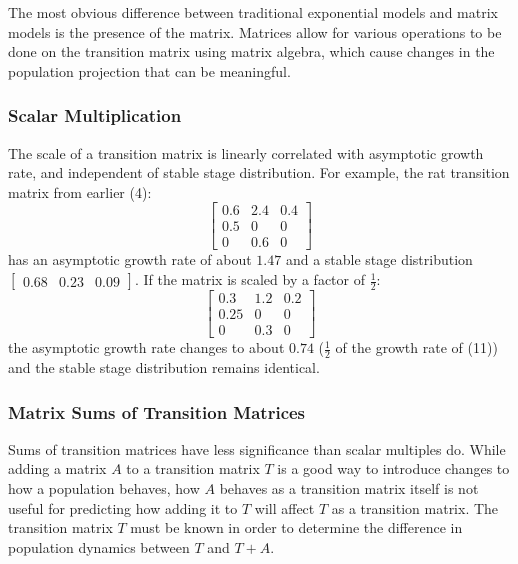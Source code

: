 \documentclass{article}
\begin{document}
    \hspace{\parindent}The most obvious difference between traditional exponential models and matrix models is the presence of the matrix.
    Matrices allow for various operations to be done on the transition matrix using matrix algebra, which cause changes in the population projection that can be meaningful.

    \subsubsection{Scalar Multiplication}

    \hspace{\parindent}The scale of a transition matrix is linearly correlated with asymptotic growth rate, and independent of stable stage distribution.
    For example, the rat transition matrix from earlier (4):
    \begin{equation}
        \begin{bmatrix}
            0.6 & 2.4 & 0.4 \\
            0.5 & 0   & 0   \\
            0   & 0.6 & 0
        \end{bmatrix}\label{eq:equation11}
    \end{equation}
    has an asymptotic growth rate of about $1.47$ and a stable stage distribution $\begin{bmatrix} 0.68 & 0.23 & 0.09 \end{bmatrix}$.
    If the matrix is scaled by a factor of $\frac{1}{2}$:
    \begin{equation}
        \begin{bmatrix}
            0.3  & 1.2 & 0.2 \\
            0.25 & 0   & 0   \\
            0    & 0.3 & 0
        \end{bmatrix}\label{eq:equation12}
    \end{equation}
    the asymptotic growth rate changes to about $0.74$ ($\frac{1}{2}$ of the growth rate of (11)) and the stable stage distribution remains identical.

    \subsubsection{Matrix Sums of Transition Matrices}

    \hspace{\parindent}Sums of transition matrices have less significance than scalar multiples do.
    While adding a matrix $A$ to a transition matrix $T$ is a good way to introduce changes to how a population behaves, how $A$ behaves as a transition matrix itself is not useful for predicting how adding it to $T$ will affect $T$ as a transition matrix.
    The transition matrix $T$ must be known in order to determine the difference in population dynamics between $T$ and $T+A$.
\end{document}
